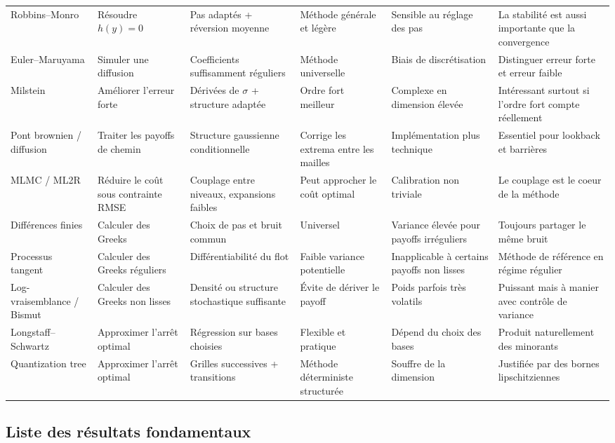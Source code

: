 \documentclass[11pt,a4paper]{article}
\begin{document}
\begin{longtable}{@{}P{0.15\textwidth}P{0.13\textwidth}P{0.14\textwidth}P{0.13\textwidth}P{0.13\textwidth}P{0.18\textwidth}@{}}
Robbins--Monro & Résoudre $h(y)=0$ & Pas adaptés + réversion moyenne & Méthode générale et légère & Sensible au réglage des pas & La stabilité est aussi importante que la convergence \\
Euler--Maruyama & Simuler une diffusion & Coefficients suffisamment réguliers & Méthode universelle & Biais de discrétisation & Distinguer erreur forte et erreur faible \\
Milstein & Améliorer l'erreur forte & Dérivées de $\sigma$ + structure adaptée & Ordre fort meilleur & Complexe en dimension élevée & Intéressant surtout si l'ordre fort compte réellement \\
Pont brownien / diffusion & Traiter les payoffs de chemin & Structure gaussienne conditionnelle & Corrige les extrema entre les mailles & Implémentation plus technique & Essentiel pour lookback et barrières \\
MLMC / ML2R & Réduire le coût sous contrainte RMSE & Couplage entre niveaux, expansions faibles & Peut approcher le coût optimal & Calibration non triviale & Le couplage est le coeur de la méthode \\
Différences finies & Calculer des Greeks & Choix de pas et bruit commun & Universel & Variance élevée pour payoffs irréguliers & Toujours partager le même bruit \\
Processus tangent & Calculer des Greeks réguliers & Différentiabilité du flot & Faible variance potentielle & Inapplicable à certains payoffs non lisses & Méthode de référence en régime régulier \\
Log-vraisemblance / Bismut & Calculer des Greeks non lisses & Densité ou structure stochastique suffisante & Évite de dériver le payoff & Poids parfois très volatils & Puissant mais à manier avec contrôle de variance \\
Longstaff--Schwartz & Approximer l'arrêt optimal & Régression sur bases choisies & Flexible et pratique & Dépend du choix des bases & Produit naturellement des minorants \\
Quantization tree & Approximer l'arrêt optimal & Grilles successives + transitions & Méthode déterministe structurée & Souffre de la dimension & Justifiée par des bornes lipschitziennes \\
\end{longtable}
\endgroup

\subsection{Liste des résultats fondamentaux}
\end{document}
